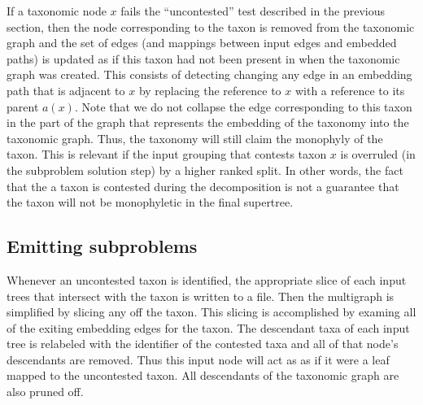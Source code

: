 \documentclass[fleqn,12pt,lineno,english]{wlpeerj}
\begin{document}
If a taxonomic node $x$ fails the ``uncontested'' test described
in the previous section, then the node corresponding to the taxon
is removed from the taxonomic graph and the set of edges (and mappings
between input edges and embedded paths) is updated as if this taxon
had not been present in when the taxonomic graph was created. This
consists of detecting changing any edge in an embedding path that
is adjacent to $x$ by replacing the reference to $x$ with a reference
to its parent $a(x)$. Note that we do not collapse the edge corresponding
to this taxon in the part of the graph that represents the embedding
of the taxonomy into the taxonomic graph. Thus, the taxonomy will
still claim the monophyly of the taxon. This is relevant if the input
grouping that contests taxon $x$ is overruled (in the subproblem
solution step) by a higher ranked split. In other words, the fact
that the a taxon is contested during the decomposition is not a guarantee
that the taxon will not be monophyletic in the final supertree.

\subsection{Emitting subproblems}

Whenever an uncontested taxon is identified, the appropriate slice
of each input trees that intersect with the taxon is written to a
file. Then the multigraph is simplified by slicing any off the taxon.
This slicing is accomplished by examing all of the exiting embedding
edges for the taxon. The descendant taxa of each input tree is relabeled
with the identifier of the contested taxa and all of that node's descendants
are removed. Thus this input node will act as as if it were a leaf
mapped to the uncontested taxon. All descendants of the taxonomic
graph are also pruned off.
\end{document}
